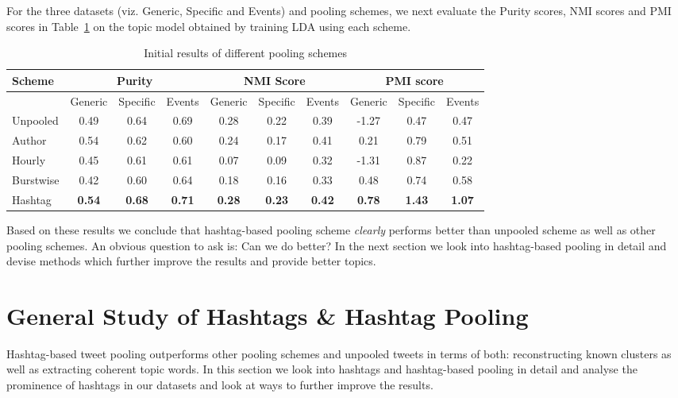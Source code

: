 \documentclass[10pt,a5paper,twoside]{article}
\begin{document}
For the three datasets (viz. Generic, Specific and Events) and pooling
schemes, we next evaluate the Purity scores, NMI scores and PMI scores
in Table~\ref{tbl-456} on the topic model obtained by training LDA
using each scheme.

\begin{table}[!h]
\centering
\resizebox{14cm}{!} 
{
	\begin{tabular}{|l|ccc|ccc|ccc|}
	\hline
	Scheme  & \multicolumn {3}{c|}{Purity} & \multicolumn {3}{c|}{NMI Score} & \multicolumn {3}{c|}{PMI score}\\
	\hline
	 & Generic & Specific & Events &  Generic & Specific & Events &  Generic & Specific & Events\\
	\hline
	Unpooled & 0.49 & 0.64 & 0.69 & 0.28 & 0.22 & 0.39 & -1.27 & 0.47 & 0.47 \\
	\hline
	Author & 0.54 & 0.62 & 0.60 & 0.24 & 0.17 & 0.41 & 0.21 & 0.79 & 0.51 \\
	\hline
	Hourly & 0.45 & 0.61 & 0.61 & 0.07 & 0.09 & 0.32 & -1.31 & 0.87 & 0.22 \\
	\hline
	Burstwise & 0.42 & 0.60 & 0.64 & 0.18 & 0.16 & 0.33 & 0.48 & 0.74 & 0.58 \\
	\hline
	Hashtag & \textbf{0.54} & \textbf{0.68} & \textbf{0.71} & \textbf{0.28} & \textbf{0.23} & \textbf{0.42} & \textbf{0.78} & \textbf{1.43} & \textbf{1.07} \\
	\hline
	\end{tabular}
}
\caption{Initial results of different pooling schemes}\label{tbl-456}
\end{table}

Based on these results we conclude that hashtag-based pooling scheme
\emph{clearly} performs better than unpooled scheme as well as other
pooling schemes. An obvious question to ask is: Can we do better? In
the next section we look into hashtag-based pooling in detail and
devise methods which further improve the results and provide better
topics.

\section{General Study of Hashtags \& Hashtag Pooling}

\label{sec:hashtag_pooling}

Hashtag-based tweet pooling outperforms other pooling schemes and
unpooled tweets in terms of both: reconstructing known clusters as
well as extracting coherent topic words. In this section we look into
hashtags and hashtag-based pooling in detail and analyse the
prominence of hashtags in our datasets and look at ways to further
improve the results.
\end{document}
